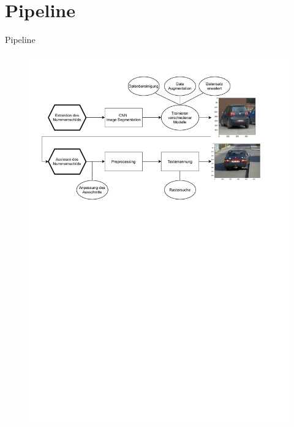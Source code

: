 \section{Pipeline}

\begin{frame}{Pipeline}
  \begin{figure}
    \begin{center}
      \includegraphics[width=\textwidth]{img/Pipeline}
    \end{center}
  \end{figure}
\end{frame}
